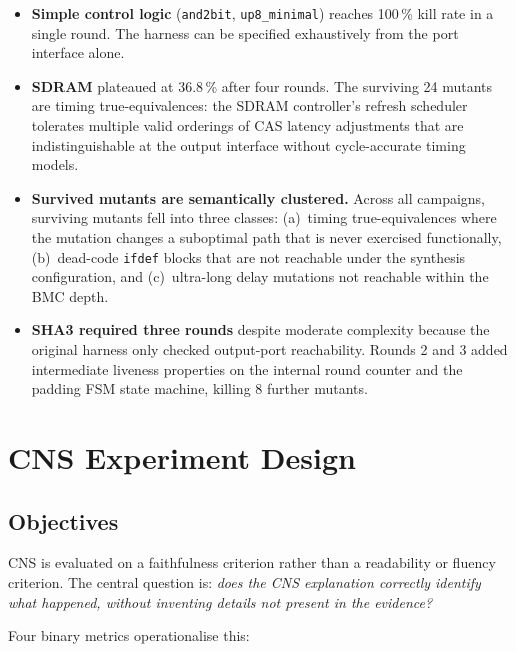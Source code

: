 \documentclass[11pt,a4paper]{article}
\begin{document}
\begin{itemize}
  \item \textbf{Simple control logic} (\texttt{and2bit}, \texttt{up8\_minimal})
    reaches 100\,\% kill rate in a single round. The harness can be specified
    exhaustively from the port interface alone.

  \item \textbf{SDRAM} plateaued at 36.8\,\% after four rounds. The surviving
    24 mutants are timing true-equivalences: the SDRAM controller's refresh
    scheduler tolerates multiple valid orderings of CAS latency adjustments
    that are indistinguishable at the output interface without cycle-accurate
    timing models.

  \item \textbf{Survived mutants are semantically clustered.}  Across all
    campaigns, surviving mutants fell into three classes: (a)~timing
    true-equivalences where the mutation changes a suboptimal path that is never
    exercised functionally, (b)~dead-code \texttt{ifdef} blocks that are not
    reachable under the synthesis configuration, and (c)~ultra-long delay
    mutations not reachable within the BMC depth.

  \item \textbf{SHA3 required three rounds} despite moderate complexity because
    the original harness only checked output-port reachability. Rounds 2 and 3
    added intermediate liveness properties on the internal round counter and the
    padding FSM state machine, killing 8 further mutants.
\end{itemize}

\section{CNS Experiment Design}

\subsection{Objectives}

CNS is evaluated on a faithfulness criterion rather than a readability or
fluency criterion. The central question is: \emph{does the CNS explanation
correctly identify what happened, without inventing details not present in the
evidence?}

Four binary metrics operationalise this:
\end{document}
